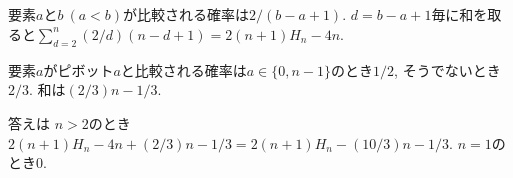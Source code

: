 \subsection{}
要素$a$と$b\ (a<b)$が比較される確率は$2/(b-a+1)$.
$d=b-a+1$毎に和を取ると$\sum_{d=2}^n (2/d)(n-d+1) = 2(n+1)H_n-4n$.

要素$a$がピボット$a$と比較される確率は$a\in\{0, n-1\}$のとき$1/2$, そうでないとき$2/3$. 和は$(2/3)n-1/3$.

答えは
$n>2$のとき$2(n+1)H_n-4n+(2/3)n-1/3=2(n+1)H_n-(10/3)n-1/3$.
$n=1$のとき$0$.
